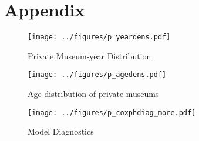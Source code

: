 \documentclass[11pt]{article}
\begin{document}
\begin{sloppypar}
\printbibliography
\end{sloppypar}




\section*{Appendix}


\begin{figure}[htbp]
\centering
\texttt{[image: ../figures/p\_yeardens.pdf]}
\caption{\label{fig:p_yeardens}Private Museum-year Distribution}
\end{figure}

\begin{figure}[htbp]
\centering
\texttt{[image: ../figures/p\_agedens.pdf]}
\caption{\label{fig:p_agedens}Age distribution of private museums}
\end{figure}


\begin{figure}[htbp]
\centering
\texttt{[image: ../figures/p\_coxphdiag\_more.pdf]}
\caption{\label{fig:p_coxphdiag_more}Model Diagnostics}
\end{figure}
\end{document}
